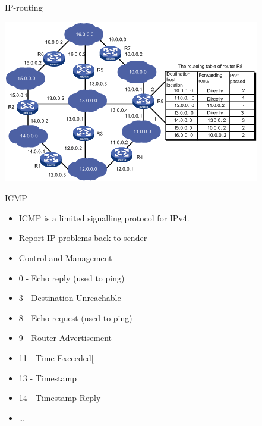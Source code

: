 \documentclass{beamer}
\begin{document}
\begin{frame}{IP-routing}
  \begin{center}
    \includegraphics[width=0.9\linewidth]{table}
  \end{center}
\end{frame}

\begin{frame}{ICMP}
  \begin{itemize}
  \item ICMP is a limited signalling protocol for IPv4.
  \item Report IP problems back to sender
  \item Control and Management
  \item 0 - Echo reply (used to ping)
  \item 3 - Destination Unreachable
  \item 8 - Echo request (used to ping)
  \item 9 - Router Advertisement
  \item 11 - Time Exceeded[
  \item 13 - Timestamp
  \item 14 - Timestamp Reply
  \item \dots
  \end{itemize}
\end{frame}
\end{document}
